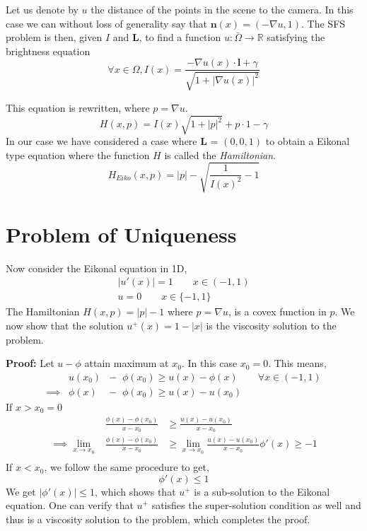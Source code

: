\noindent Let us denote by $u$ the distance of the points in the scene to the camera. In this case we can without loss of generality say that $\mathbf{n}(x) = (-\nabla u, 1)$. The SFS problem is then, given $I$ and \textbf{L}, to find a function $ u : \bar{\Omega} \rightarrow \mathbb{R}$ satisfying the brightness equation
\begin{equation}
	\forall x \in \Omega,  I(x) = \frac{-\nabla u(x) \cdot \mathbf{l} + \gamma}{\sqrt{1 + \lvert \nabla u(x) \rvert ^2}}
\end{equation}

\noindent This equation is rewritten, where $ p = \nabla u $. 
\begin{equation}
	H(x,p) = I(x)\sqrt{1+\lvert p \rvert^2} + p\cdot 1 - \gamma
\end{equation}
\noindent In our case we have considered a case where \textbf{L} = $(0,0,1)$ to obtain a Eikonal type equation where the function $H$ is called the \emph{Hamiltonian}.
\begin{equation}
	H_{Eiko} (x,p) = \lvert p \rvert - \sqrt{\frac{1}{I(x)^2} - 1}
\end{equation}

\section{Problem of Uniqueness}
\noindent Now consider the Eikonal equation in 1D,
\begin{eqnarray}
	\lvert u'(x)\rvert = 1 \qquad x\in (-1,1)\\
	u = 0 \qquad x\in \{-1,1 \}
\end{eqnarray}
\noindent The Hamiltonian $H(x,p) = \lvert p\rvert -1$ where $p=\nabla u$, is a covex function in $p$. We now show that the solution $u^+(x) = 1 - \lvert x\rvert$ is the viscosity solution to the problem.

\noindent \textbf{Proof:} Let $u-\phi$ attain maximum at $x_0$. In this case $x_0 = 0$.
\noindent This means,
\begin{eqnarray}
	&u(x_0)& - \;\;\phi(x_0) \ge u(x) - \phi(x) \qquad \forall x\in (-1,1) \\
	\implies &\phi(x)& - \;\;\phi(x_0) \ge u(x) - u(x_0)
\end{eqnarray}
\noindent If $x>x_0 =0$
\begin{eqnarray}
	&\frac{\phi(x) - \phi(x_0)}{x-x_0} &\ge \frac{u(x)-u(x_0)}{x-x_0} \\
	\implies \lim_{x\to x_0} &\frac{\phi(x) - \phi(x_0)}{x-x_0} &\ge \lim_{x\to x_0}\frac{u(x)-u(x_0)}{x-x_0}
	\phi' (x) \ge -1 \\
\end{eqnarray}
\noindent If $x<x_0$, we follow the same procedure to get,
\begin{equation}
	\phi'(x) \le 1
\end{equation}
\noindent We get $\lvert \phi'(x)\rvert \le 1$, which shows that $u^+$ is a sub-solution to the Eikonal equation. One can verify that $u^+$ satisfies the super-solution condition as well and thus is a viscosity solution to the problem, which completes the proof.


